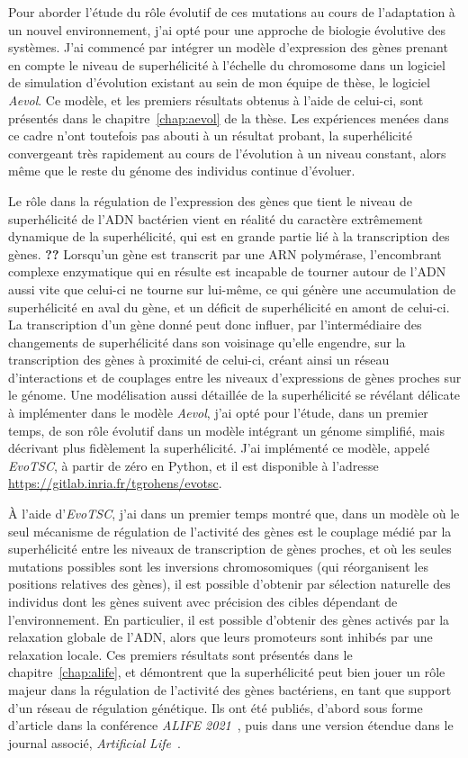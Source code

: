 Pour aborder l'étude du rôle évolutif de ces mutations au cours de l'adaptation à un nouvel environnement, j'ai opté pour une approche de biologie évolutive des systèmes.
J'ai commencé par intégrer un modèle d'expression des gènes prenant en compte le niveau de superhélicité à l'échelle du chromosome dans un logiciel de simulation d'évolution existant au sein de mon équipe de thèse, le logiciel \emph{Aevol}.
Ce modèle, et les premiers résultats obtenus à l'aide de celui-ci, sont présentés dans le chapitre~\ref{chap:aevol} de la thèse.
Les expériences menées dans ce cadre n'ont toutefois pas abouti à un résultat probant, la superhélicité convergeant très rapidement au cours de l'évolution à un niveau constant, alors même que le reste du génome des individus continue d'évoluer.

Le rôle dans la régulation de l'expression des gènes que tient le niveau de superhélicité de l'ADN bactérien vient en réalité du caractère extrêmement dynamique de la superhélicité, qui est en grande partie lié à la transcription des gènes. \textbf{??}
Lorsqu'un gène est transcrit par une ARN polymérase, l'encombrant complexe enzymatique qui en résulte est incapable de tourner autour de l'ADN aussi vite que celui-ci ne tourne sur lui-même, ce qui génère une accumulation de superhélicité en aval du gène, et un déficit de superhélicité en amont de celui-ci.
La transcription d'un gène donné peut donc influer, par l'intermédiaire des changements de superhélicité dans son voisinage qu'elle engendre, sur la transcription des gènes à proximité de celui-ci, créant ainsi un réseau d'interactions et de couplages entre les niveaux d'expressions de gènes proches sur le génome.
Une modélisation aussi détaillée de la superhélicité se révélant délicate à implémenter dans le modèle \emph{Aevol}, j'ai opté pour l'étude, dans un premier temps, de son rôle évolutif dans un modèle intégrant un génome simplifié, mais décrivant plus fidèlement la superhélicité.
J'ai implémenté ce modèle, appelé \emph{EvoTSC}, à partir de zéro en Python, et il est disponible à l'adresse \url{https://gitlab.inria.fr/tgrohens/evotsc}.

À l'aide d'\emph{EvoTSC}, j'ai dans un premier temps montré que, dans un modèle où le seul mécanisme de régulation de l'activité des gènes est le couplage médié par la superhélicité entre les niveaux de transcription de gènes proches, et où les seules mutations possibles sont les inversions chromosomiques (qui réorganisent les positions relatives des gènes), il est possible d'obtenir par sélection naturelle des individus dont les gènes suivent avec précision des cibles dépendant de l'environnement.
En particulier, il est possible d'obtenir des gènes activés par la relaxation globale de l'ADN, alors que leurs promoteurs sont inhibés par une relaxation locale.
Ces premiers résultats sont présentés dans le chapitre~\ref{chap:alife}, et démontrent que la superhélicité peut bien jouer un rôle majeur dans la régulation de l'activité des gènes bactériens, en tant que support d'un réseau de régulation génétique.
Ils ont été publiés, d'abord sous forme d'article dans la conférence \emph{ALIFE 2021}~\citep{grohens2021}, puis dans une version étendue dans le journal associé, \emph{Artificial Life}~\citep{grohens2022a}.

